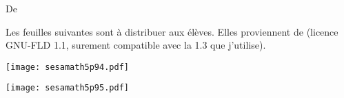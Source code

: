 


De \cite{NRHooXFvgpp5}

\vfill

Les feuilles suivantes sont à distribuer aux élèves. Elles proviennent de \cite{NRHooXFvgpp5} (licence GNU-FLD 1.1, surement compatible avec la 1.3 que j'utilise).

\begin{center}
\texttt{[image: sesamath5p94.pdf]}
\end{center}
\begin{center}
\texttt{[image: sesamath5p95.pdf]}
\end{center}
